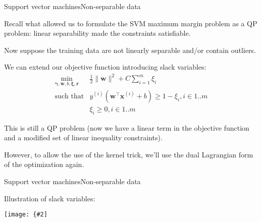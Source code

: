 \documentclass{beamer}
\renewcommand{\vec}[1]{\boldsymbol{#1}}
\newcommand{\myfig}[3]{\centerline{\texttt{[image: \{\#2]}}}
    \centerline{\scriptsize #3}}
\begin{document}
\begin{frame}{Support vector machines}{Non-separable data}

  Recall what allowed us to formulate the SVM maximum margin problem
  as a QP problem: \alert{linear separability made the constraints satisfiable}.

  \medskip

  Now suppose the training data are \alert{not} linearly separable
  and/or contain \alert{outliers}.

  \medskip

  We can extend our objective function introducing \alert{slack variables}:
  \[ \begin{array}{rl}
    \min_{\vec{\gamma},\vec{w},b,\vec{\xi},\vec{r}} & \frac{1}{2}\|\vec{w}\|^2 + C\sum_{i=1}^m \xi_i \\
    \text{such that} & y^{(i)}(\vec{w}^\top \vec{x}^{(i)}+b) \ge 1-\xi_i, i \in 1..m \\
    & \xi_i \ge 0, i \in 1..m
  \end{array} \]

  This is still a QP problem (now we have a linear term in the
  objective function and a modified set of linear inequality
  constraints).

  \medskip

  However, to allow the use of the kernel trick, we'll use the dual
  Lagrangian form of the optimization again.
  
\end{frame}


\begin{frame}{Support vector machines}{Non-separable data}

  Illustration of slack variables:

  \medskip

  \myfig{2.8in}{slack}{Bishop (2006), Figure 7.3}

\end{frame}
\end{document}
